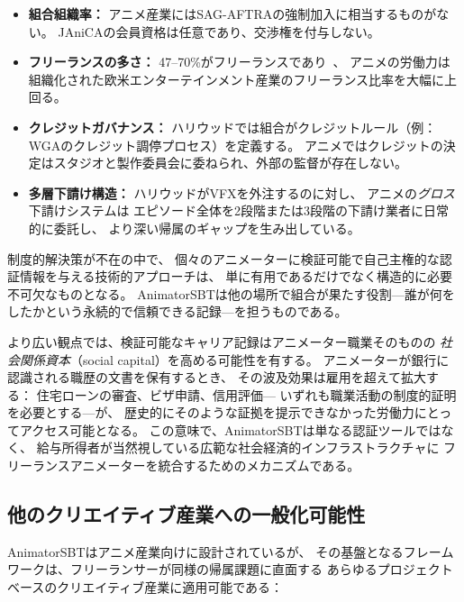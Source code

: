 \begin{itemize}
  \item \textbf{組合組織率：}
    アニメ産業にはSAG-AFTRAの強制加入に相当するものがない。
    JAniCAの会員資格は任意であり、交渉権を付与しない。
  \item \textbf{フリーランスの多さ：}
    47--70\%がフリーランスであり~\cite{janica2023survey}、
    アニメの労働力は組織化された欧米エンターテインメント産業のフリーランス比率を大幅に上回る。
  \item \textbf{クレジットガバナンス：}
    ハリウッドでは組合がクレジットルール（例：WGAのクレジット調停プロセス）を定義する。
    アニメではクレジットの決定はスタジオと製作委員会に委ねられ、外部の監督が存在しない。
  \item \textbf{多層下請け構造：}
    ハリウッドがVFXを外注するのに対し、
    アニメの\textit{グロス}下請けシステムは
    エピソード全体を2段階または3段階の下請け業者に日常的に委託し、
    より深い帰属のギャップを生み出している。
\end{itemize}

制度的解決策が不在の中で、
個々のアニメーターに検証可能で自己主権的な認証情報を与える技術的アプローチは、
単に有用であるだけでなく構造的に必要不可欠なものとなる。
AnimatorSBTは他の場所で組合が果たす役割---誰が何をしたかという永続的で信頼できる記録---を担うものである。

より広い観点では、検証可能なキャリア記録はアニメーター職業そのものの
\textit{社会関係資本}（social capital）を高める可能性を有する。
アニメーターが銀行に認識される職歴の文書を保有するとき、
その波及効果は雇用を超えて拡大する：
住宅ローンの審査、ビザ申請、信用評価---
いずれも職業活動の制度的証明を必要とする---が、
歴史的にそのような証拠を提示できなかった労働力にとってアクセス可能となる。
この意味で、AnimatorSBTは単なる認証ツールではなく、
給与所得者が当然視している広範な社会経済的インフラストラクチャに
フリーランスアニメーターを統合するためのメカニズムである。

\subsection{他のクリエイティブ産業への一般化可能性}
\label{subsec:generalizability}

AnimatorSBTはアニメ産業向けに設計されているが、
その基盤となるフレームワークは、フリーランサーが同様の帰属課題に直面する
あらゆるプロジェクトベースのクリエイティブ産業に適用可能である：

